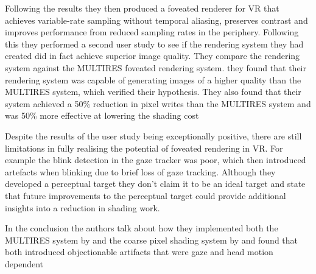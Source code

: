 Following the results they then produced a foveated renderer for VR that achieves variable-rate sampling without temporal aliasing, preserves contrast and improves performance from reduced sampling rates in the periphery. Following this they performed a second user study to see if the rendering system they had created did in fact achieve superior image quality. They compare the rendering system against the MULTIRES foveated rendering system. they found that their rendering system was capable of generating images of a higher quality than the MULTIRES system, which verified their hypothesis. They also found that their system achieved a 50\% reduction in pixel writes than the MULTIRES system and was 50\% more effective at lowering the shading cost 

Despite the results of the user study being exceptionally positive, there are still limitations in fully realising the potential of foveated rendering in VR. For example the blink detection in the gaze tracker was poor, which then introduced artefacts when blinking due to brief loss of gaze tracking. Although they developed a perceptual target they don’t claim it to be an ideal target and state that future improvements to the perceptual target could provide additional insights into a reduction in shading work.

In the conclusion the authors talk about how they implemented both the MULTIRES system by \cite{Guenter:2012:FG:2366145.2366183} and the coarse pixel shading system by \cite{Vaidyanathan:2014:CPS:2980009.2980011} and found that both introduced objectionable artifacts that were gaze and head motion dependent